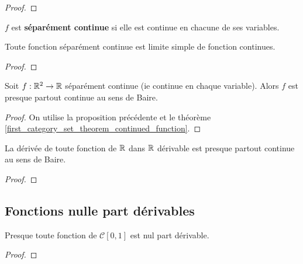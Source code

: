 \ifdefined\outputproof
\begin{proof}

\end{proof}
\fi

\begin{definition} 
	$f$ est \textbf{séparément continue} si elle est continue en chacune de ses
	variables.
\end{definition}

\begin{proposition}
	Toute fonction séparément continue est limite simple de fonction continues.
\end{proposition}

\ifdefined\outputproof
\begin{proof}

\end{proof}
\fi

\begin{corollary}
	Soit $f : \mathbb{R}^{2} \rightarrow \mathbb{R}$ séparément continue (ie continue en
	chaque variable). Alors $f$ est presque partout continue au sens de Baire.
\end{corollary}

\ifdefined\outputproof
\begin{proof}
	On utilise la proposition précédente et le théorème
	\ref{first_category_set_theorem_continued_function}.
\end{proof}
\fi

\begin{corollary}
	La dérivée de toute fonction de $\mathbb{R}$ dans $\mathbb{R}$ dérivable est presque
	partout continue au sens de Baire.
\end{corollary}

\ifdefined\outputproof
\begin{proof}

\end{proof}
\fi

\subsection{Fonctions nulle part dérivables}

\begin{theorem}
	Presque toute fonction de $\mathcal{C}[0, 1]$ est nul part dérivable.
\end{theorem}

\ifdefined\outputproof
\begin{proof}

\end{proof}
\fi
